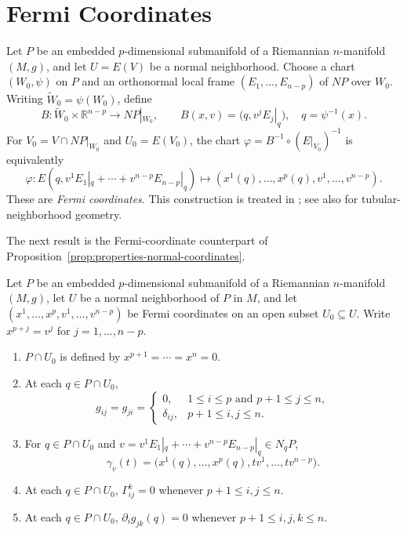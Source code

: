 \section{Fermi Coordinates}

Let $P$ be an embedded $p$-dimensional submanifold of a Riemannian
$n$-manifold $(M,g)$, and let $U=E(V)$ be a normal neighborhood.  Choose a
chart $(W_0,\psi)$ on $P$ and an orthonormal local frame
$(E_1,\ldots,E_{n-p})$ of $NP$ over $W_0$.  Writing
$\widetilde W_0=\psi(W_0)$, define
\[
B:\widetilde W_0\times\mathbb R^{n-p}\longrightarrow NP|_{W_0},
\qquad
B(x,v)=\bigl(q,v^jE_j|_q\bigr),
\quad q=\psi^{-1}(x).
\]
For $V_0=V\cap NP|_{W_0}$ and $U_0=E(V_0)$, the chart
$\varphi=B^{-1}\circ(E|_{V_0})^{-1}$ is equivalently
\begin{equation}
\varphi: E\left(q, v^1 E_1|_q + \cdots + v^{n-p} E_{n-p}|_q\right)
\mapsto \left(x^1(q), \ldots, x^p(q), v^1, \ldots, v^{n-p}\right). \tag{5.25}
\end{equation}
These are \emph{Fermi coordinates}.  This construction is treated in
\cite{Gra82}; see also \cite{Gra04} for tubular-neighborhood geometry.

The next result is the Fermi-coordinate counterpart of
Proposition~\ref{prop:properties-normal-coordinates}.

\begin{proposition}
\label{prop:fermi-coordinates-properties}

Let $P$ be an embedded $p$-dimensional submanifold of a Riemannian
$n$-manifold $(M,g)$, let $U$ be a normal neighborhood of $P$ in $M$, and let
$(x^1, \ldots, x^p, v^1, \ldots, v^{n-p})$ be Fermi coordinates on an open
subset $U_0\subseteq U$.  Write $x^{p+j}=v^j$ for $j=1,\ldots,n-p$.
\begin{enumerate}
\item[(a)] $P\cap U_0$ is defined by $x^{p+1}=\cdots=x^n=0$.
\item[(b)] At each $q\in P\cap U_0$,
\[
g_{ij} = g_{ji} = \begin{cases}
0, & 1 \le i \le p \text{ and } p+1 \le j \le n, \\
\delta_{ij}, & p+1 \le i, j \le n.
\end{cases}
\]
\item[(c)] For $q\in P\cap U_0$ and
$v=v^1E_1|_q+\cdots+v^{n-p}E_{n-p}|_q\in N_qP$,
\[
\gamma_v(t)=\bigl(x^1(q),\ldots,x^p(q),tv^1,\ldots,tv^{n-p}\bigr).
\]
\item[(d)] At each $q\in P\cap U_0$, $\Gamma^k_{ij}=0$ whenever
$p+1\leq i,j\leq n$.
\item[(e)] At each $q\in P\cap U_0$, $\partial_i g_{jk}(q)=0$ whenever
$p+1\leq i,j,k\leq n$.
\end{enumerate}
\end{proposition}
